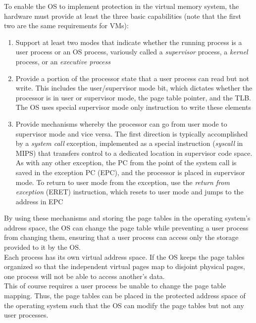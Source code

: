 \documentclass[12pt]{article}
\theoremstyle{definition}
\begin{document}
  To enable the OS to implement protection in the virtual memory system, the hardware must provide at least the three basic capabilities (note that the first two are the same requirements for VMs):
  \begin{enumerate}
    \item Support at least two modes that indicate whether the running process is a user process or an OS process, variously called a \emph{supervisor} process, a \emph{kernel} process, or an \emph{executive process}
    \item Provide a portion of the processor state that a user process can read but not write.
    This includes the user/supervisor mode bit, which dictates whether the processor is in user or supervisor mode, the page table pointer, and the TLB.
    The OS uses special supervisor mode only instruction to write these elements
    \item Provide mechanisms whereby the processor can go from user mode to supervisor mode and vice versa.
    The first direction is typically accomplished by a \emph{system call} exception, implemented as a special instruction (\emph{syscall} in MIPS) that transfers control to a dedicated location in supervisor code space.
    As with any other exception, the PC from the point of the system call is saved in the exception PC (EPC), and the processor is placed in supervisor mode.
    To return to user mode from the exception, use the \emph{return from exception} (ERET) instruction, which resets to user mode and jumps to the address in EPC
  \end{enumerate}

  By using these mechanisms and storing the page tables in the operating system's address space, the OS can change the page table while preventing a user process from changing them, ensuring that a user process can access only the storage provided to it by the OS. \\

  Each process has its own virtual address space.
  If the OS keeps the page tables organized so that the independent virtual pages map to disjoint physical pages, one process will not be able to access another's data. \\
  This of course requires a user process be unable to change the page table mapping.
  Thus, the page tables can be placed in the protected address space of the operating system such that the OS can modify the page tables but not any user processes. \\
\end{document}
